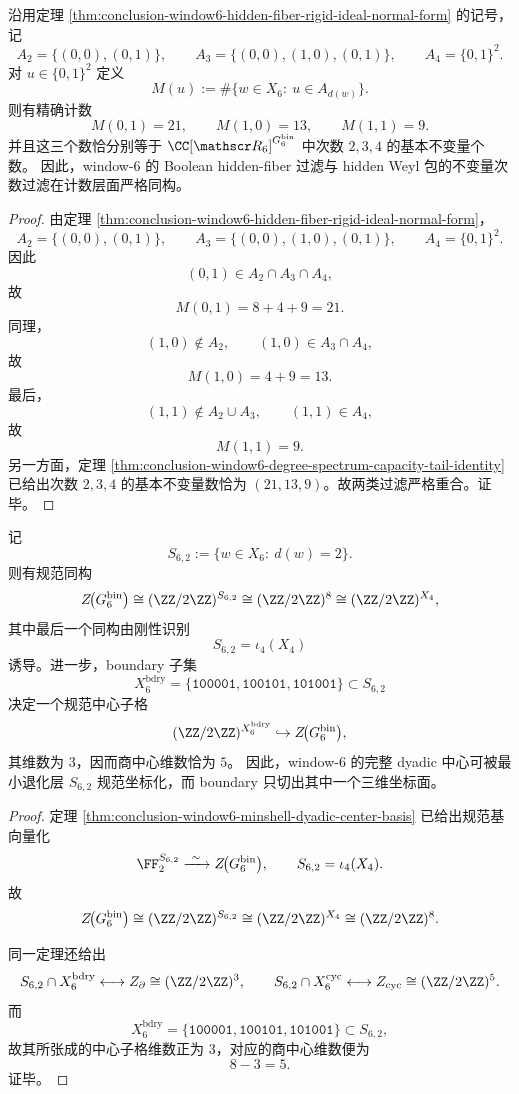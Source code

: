 \begin{theorem}\label{thm:conclusion-window6-orderideal-weyl-degree-filtration-identification}
沿用定理 \ref{thm:conclusion-window6-hidden-fiber-rigid-ideal-normal-form} 的记号，记
\[
A_2=\{(0,0),(0,1)\},
\qquad
A_3=\{(0,0),(1,0),(0,1)\},
\qquad
A_4=\{0,1\}^2.
\]
对 \(u\in\{0,1\}^2\) 定义
\[
M(u):=\#\{w\in X_6:\ u\in A_{d(w)}\}.
\]
则有精确计数
\[
M(0,1)=21,
\qquad
M(1,0)=13,
\qquad
M(1,1)=9.
\]
并且这三个数恰分别等于 \(\CC[\mathscr R_6]^{G_6^{\mathrm{bin}}}\) 中次数 \(2,3,4\) 的基本不变量个数。
因此，window-\(6\) 的 Boolean hidden-fiber 过滤与 hidden Weyl 包的不变量次数过滤在计数层面严格同构。
\end{theorem}
\begin{proof}
由定理 \ref{thm:conclusion-window6-hidden-fiber-rigid-ideal-normal-form}，
\[
A_2=\{(0,0),(0,1)\},
\qquad
A_3=\{(0,0),(1,0),(0,1)\},
\qquad
A_4=\{0,1\}^2.
\]
因此
\[
(0,1)\in A_2\cap A_3\cap A_4,
\]
故
\[
M(0,1)=8+4+9=21.
\]
同理，
\[
(1,0)\notin A_2,\qquad (1,0)\in A_3\cap A_4,
\]
故
\[
M(1,0)=4+9=13.
\]
最后，
\[
(1,1)\notin A_2\cup A_3,\qquad (1,1)\in A_4,
\]
故
\[
M(1,1)=9.
\]
另一方面，定理 \ref{thm:conclusion-window6-degree-spectrum-capacity-tail-identity} 已给出次数 \(2,3,4\) 的基本不变量数恰为 \((21,13,9)\)。故两类过滤严格重合。证毕。
\end{proof}

\begin{theorem}\label{thm:conclusion-window6-center-minimal-degeneracy-coordinate-plane}
记
\[
S_{6,2}:=\{w\in X_6:\ d(w)=2\}.
\]
则有规范同构
\[
Z\!\bigl(G_6^{\mathrm{bin}}\bigr)
\cong
(\ZZ/2\ZZ)^{S_{6,2}}
\cong
(\ZZ/2\ZZ)^8
\cong
(\ZZ/2\ZZ)^{X_4},
\]
其中最后一个同构由刚性识别
\[
S_{6,2}=\iota_4(X_4)
\]
诱导。进一步，boundary 子集
\[
X_6^{\mathrm{bdry}}
=
\{\mathtt{100001},\mathtt{100101},\mathtt{101001}\}
\subset S_{6,2}
\]
决定一个规范中心子格
\[
(\ZZ/2\ZZ)^{X_6^{\mathrm{bdry}}}
\hookrightarrow
Z\!\bigl(G_6^{\mathrm{bin}}\bigr),
\]
其维数为 \(3\)，因而商中心维数恰为 \(5\)。
因此，window-\(6\) 的完整 dyadic 中心可被最小退化层 \(S_{6,2}\) 规范坐标化，而 boundary 只切出其中一个三维坐标面。
\end{theorem}
\begin{proof}
定理 \ref{thm:conclusion-window6-minshell-dyadic-center-basis} 已给出规范基向量化
\[
\FF_2^{S_{6,2}}
\xrightarrow{\ \sim\ }
Z\!\bigl(G_6^{\mathrm{bin}}\bigr),
\qquad
S_{6,2}=\iota_4(X_4).
\]
故
\[
Z\!\bigl(G_6^{\mathrm{bin}}\bigr)
\cong
(\ZZ/2\ZZ)^{S_{6,2}}
\cong
(\ZZ/2\ZZ)^{X_4}
\cong
(\ZZ/2\ZZ)^8.
\]

同一定理还给出
\[
S_{6,2}\cap X_6^{\mathrm{bdry}}
\longleftrightarrow
Z_{\partial}\cong (\ZZ/2\ZZ)^3,
\qquad
S_{6,2}\cap X_6^{\mathrm{cyc}}
\longleftrightarrow
Z_{\mathrm{cyc}}\cong (\ZZ/2\ZZ)^5.
\]
而
\[
X_6^{\mathrm{bdry}}
=
\{\mathtt{100001},\mathtt{100101},\mathtt{101001}\}
\subset S_{6,2},
\]
故其所张成的中心子格维数正为 \(3\)，对应的商中心维数便为
\[
8-3=5.
\]
证毕。
\end{proof}

